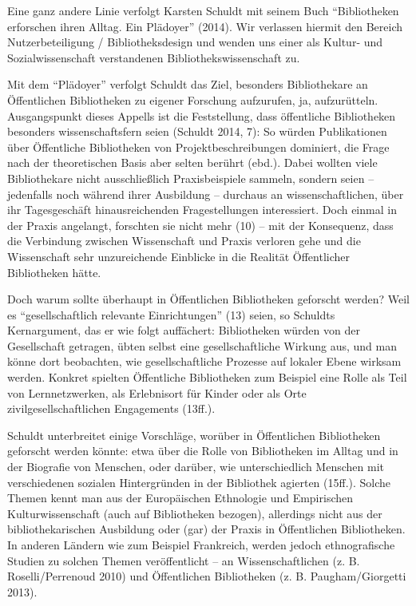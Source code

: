 \documentclass[a4paper,
fontsize=11pt,
oneside,
numbers=noperiodatend,
parskip=half-,
bibliography=totoc,
final
]{scrartcl}
\begin{document}
Eine ganz andere Linie verfolgt Karsten Schuldt mit seinem Buch
\enquote{Bibliotheken erforschen ihren Alltag. Ein Plädoyer} (2014). Wir
verlassen hiermit den Bereich Nutzerbeteiligung / Bibliotheksdesign und
wenden uns einer als Kultur- und Sozialwissenschaft verstandenen
Bibliothekswissenschaft zu.

Mit dem \enquote{Plädoyer} verfolgt Schuldt das Ziel, besonders
Bibliothekare an Öffentlichen Bibliotheken zu eigener Forschung
aufzurufen, ja, aufzurütteln. Ausgangspunkt dieses Appells ist die
Feststellung, dass öffentliche Bibliotheken besonders wissenschaftsfern
seien (Schuldt 2014, 7): So würden Publikationen über Öffentliche
Bibliotheken von Projektbeschreibungen dominiert, die Frage nach der
theoretischen Basis aber selten berührt (ebd.). Dabei wollten viele
Bibliothekare nicht ausschließlich Praxisbeispiele sammeln, sondern
seien -- jedenfalls noch während ihrer Ausbildung -- durchaus an
wissenschaftlichen, über ihr Tagesgeschäft hinausreichenden
Fragestellungen interessiert. Doch einmal in der Praxis angelangt,
forschten sie nicht mehr (10) -- mit der Konsequenz, dass die Verbindung
zwischen Wissenschaft und Praxis verloren gehe und die Wissenschaft sehr
unzureichende Einblicke in die Realität Öffentlicher Bibliotheken hätte.

Doch warum sollte überhaupt in Öffentlichen Bibliotheken geforscht
werden? Weil es \enquote{gesellschaftlich relevante Einrichtungen} (13)
seien, so Schuldts Kernargument, das er wie folgt auffächert:
Bibliotheken würden von der Gesellschaft getragen, übten selbst eine
gesellschaftliche Wirkung aus, und man könne dort beobachten, wie
gesellschaftliche Prozesse auf lokaler Ebene wirksam werden. Konkret
spielten Öffentliche Bibliotheken zum Beispiel eine Rolle als Teil von
Lernnetzwerken, als Erlebnisort für Kinder oder als Orte
zivilgesellschaftlichen Engagements (13ff.).

Schuldt unterbreitet einige Vorschläge, worüber in Öffentlichen
Bibliotheken geforscht werden könnte: etwa über die Rolle von
Bibliotheken im Alltag und in der Biografie von Menschen, oder darüber,
wie unterschiedlich Menschen mit verschiedenen sozialen Hintergründen in
der Bibliothek agierten (15ff.). Solche Themen kennt man aus der
Europäischen Ethnologie und Empirischen Kulturwissenschaft (auch auf
Bibliotheken bezogen), allerdings nicht aus der bibliothekarischen
Ausbildung oder (gar) der Praxis in Öffentlichen Bibliotheken. In
anderen Ländern wie zum Beispiel Frankreich, werden jedoch
ethnografische Studien zu solchen Themen veröffentlicht -- an
Wissenschaftlichen (z. B. Roselli/Perrenoud 2010) und Öffentlichen
Bibliotheken (z. B. Paugham/Giorgetti 2013).
\end{document}
